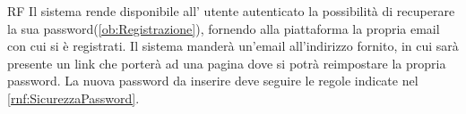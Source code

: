 \begin{listaPersonale}{RF}
	Il sistema rende disponibile all' utente autenticato la possibilità di recuperare la sua password(\ref{ob:Registrazione}), fornendo alla piattaforma la propria email con cui si è registrati. Il sistema manderà un'email all'indirizzo fornito, in cui sarà presente un link che porterà ad una pagina dove si potrà reimpostare la propria password. La nuova password da inserire deve seguire le regole indicate nel  \ref{rnf:SicurezzaPassword}. %
\end{listaPersonale}